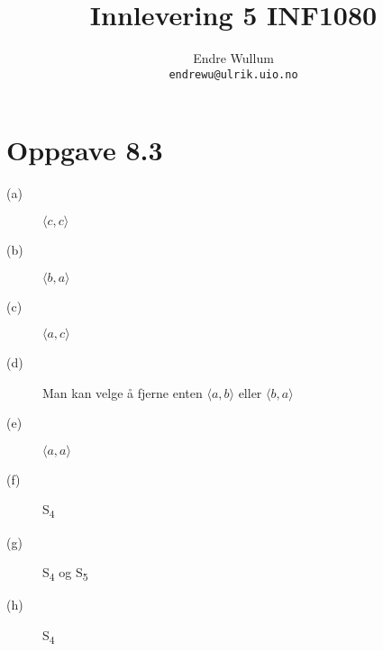 \documentclass[12pt,norsk,a4paper]{article}
\title{Innlevering 5 INF1080}
\author{Endre Wullum\\ \texttt{endrewu@ulrik.uio.no}}
\begin{document}
\maketitle

\section*{Oppgave 8.3}
\begin{description}
\item[(a)]$\langle c, c\rangle$
\item[(b)]$\langle b, a\rangle$
\item[(c)]$\langle a, c\rangle$
\item[(d)]Man kan velge å fjerne enten $\langle a, b\rangle$ eller $\langle b, a\rangle$
\item[(e)]$\langle a, a\rangle$
\item[(f)]S\textsubscript{4}
\item[(g)]S\textsubscript{4} og S\textsubscript{5}
\item[(h)]S\textsubscript{4}
\end{description}


\end{document}
